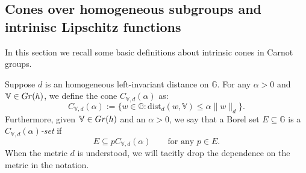 \documentclass[10pt, a4paper,
oneside, headinclude,footinclude]{scrartcl}
\begin{document}
\subsection{Cones over homogeneous subgroups and intrinisc Lipschitz functions}\label{sub:Cones}

In this section we recall some basic definitions about intrinsic cones in Carnot groups.
\begin{definizione}\label{def:Cone}
Suppose $d$ is an homogeneous left-invariant distance on $\mathbb{G}$. For any  $\alpha>0$ and $\mathbb V\in Gr(h)$, we define the cone $C_{\mathbb V,d}(\alpha)$ as:
$$C_{\mathbb V,d}(\alpha):=\{w\in\mathbb{G}:\mathrm{dist}_{d}(w,\mathbb V)\leq \alpha\|w\|_{d}\}.$$
Furthermore, given $\mathbb V\in Gr(h)$ and an $\alpha>0$, we say that a Borel set $E\subseteq \mathbb G$ is a {\em $C_{\mathbb V,d}(\alpha)$-set} if
$$
E\subseteq pC_{\mathbb V,d}(\alpha) \qquad  \text{for any } p\in E. 
$$
When the metric $d$ is understood, we will tacitly drop the dependence on the metric in the notation.
\end{definizione}
\end{document}
